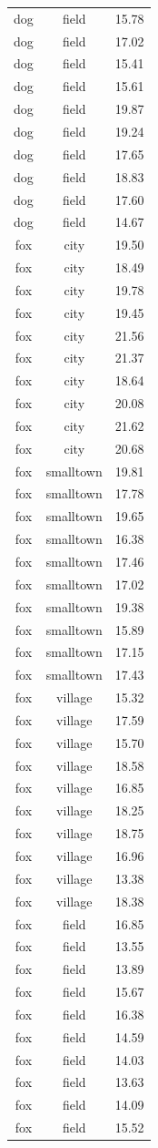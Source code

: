 \documentclass[
  letterpaper,
]{scrbook}
\begin{document}
\begin{longtable}[]{@{}ccc@{}}
dog & field & 15.78 \\
dog & field & 17.02 \\
dog & field & 15.41 \\
dog & field & 15.61 \\
dog & field & 19.87 \\
dog & field & 19.24 \\
dog & field & 17.65 \\
dog & field & 18.83 \\
dog & field & 17.60 \\
dog & field & 14.67 \\
fox & city & 19.50 \\
fox & city & 18.49 \\
fox & city & 19.78 \\
fox & city & 19.45 \\
fox & city & 21.56 \\
fox & city & 21.37 \\
fox & city & 18.64 \\
fox & city & 20.08 \\
fox & city & 21.62 \\
fox & city & 20.68 \\
fox & smalltown & 19.81 \\
fox & smalltown & 17.78 \\
fox & smalltown & 19.65 \\
fox & smalltown & 16.38 \\
fox & smalltown & 17.46 \\
fox & smalltown & 17.02 \\
fox & smalltown & 19.38 \\
fox & smalltown & 15.89 \\
fox & smalltown & 17.15 \\
fox & smalltown & 17.43 \\
fox & village & 15.32 \\
fox & village & 17.59 \\
fox & village & 15.70 \\
fox & village & 18.58 \\
fox & village & 16.85 \\
fox & village & 18.25 \\
fox & village & 18.75 \\
fox & village & 16.96 \\
fox & village & 13.38 \\
fox & village & 18.38 \\
fox & field & 16.85 \\
fox & field & 13.55 \\
fox & field & 13.89 \\
fox & field & 15.67 \\
fox & field & 16.38 \\
fox & field & 14.59 \\
fox & field & 14.03 \\
fox & field & 13.63 \\
fox & field & 14.09 \\
fox & field & 15.52 \\
\bottomrule()
\end{longtable}
\end{document}
